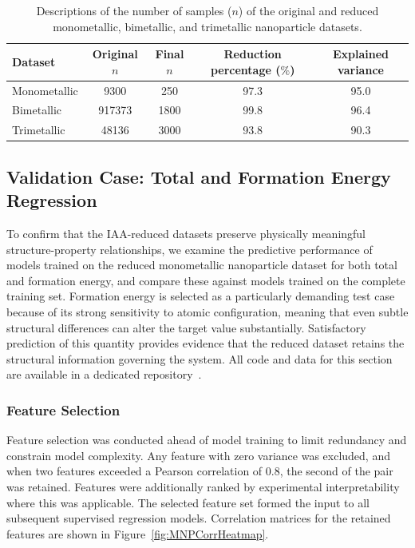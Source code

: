 \documentclass{WileyMSP-template}
\begin{document}
\begin{table}[t]
\caption{Descriptions of the number of samples ($n$) of the original and reduced monometallic, bimetallic, and trimetallic nanoparticle datasets.}
\centering
\small
\begin{tabular}[width=\textwidth]{l|cccc}
\hline
Dataset      & Original $n$ & Final $n$ & Reduction percentage ($\%$) & Explained variance \\
\hline
Monometallic &         9300 &       250 &                        97.3 &               95.0 \\
Bimetallic   &       917373 &      1800 &                        99.8 &               96.4 \\
Trimetallic  &        48136 &      3000 &                        93.8 &               90.3 \\
\hline
\end{tabular}
\label{tab:redRedOutcomeReducedData}
\end{table}


\subsection{Validation Case: Total and Formation Energy Regression}
\label{sec:MNPregEtotEform}

To confirm that the IAA-reduced datasets preserve physically meaningful structure-property relationships, we examine the predictive performance of models trained on the reduced monometallic nanoparticle dataset for both total and formation energy, and compare these against models trained on the complete training set. Formation energy is selected as a particularly demanding test case because of its strong sensitivity to atomic configuration, meaning that even subtle structural differences can alter the target value substantially. Satisfactory prediction of this quantity provides evidence that the reduced dataset retains the structural information governing the system. All code and data for this section are available in a dedicated repository~\cite{MNPERegRepo}.

\subsubsection{Feature Selection}
\label{sec:featSelection}

Feature selection was conducted ahead of model training to limit redundancy and constrain model complexity. Any feature with zero variance was excluded, and when two features exceeded a Pearson correlation of 0.8, the second of the pair was retained. Features were additionally ranked by experimental interpretability where this was applicable. The selected feature set formed the input to all subsequent supervised regression models. Correlation matrices for the retained features are shown in Figure~\ref{fig:MNPCorrHeatmap}.
\end{document}
